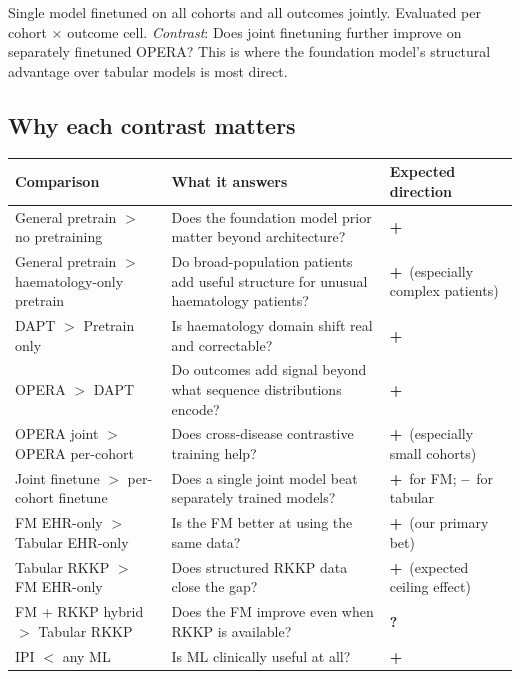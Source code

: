 \documentclass[11pt, a4paper]{article}
\newcommand{\yes}{\textcolor{positive}{\textbf{+}}}
\newcommand{\no}{\textcolor{negative}{\textbf{--}}}
\newcommand{\maybe}{\textcolor{neutral}{\textbf{?}}}
\begin{document}
\begin{tcolorbox}[planbox, title=Tier structure and contrasts of interest]
\begin{description}[leftmargin=0em, itemsep=4pt]
  \item[Tier 5 -- Joint multi-task finetuning]
    Single model finetuned on all cohorts and all outcomes jointly.
    Evaluated per cohort × outcome cell.
    \emph{Contrast}: Does joint finetuning further improve on separately
    finetuned OPERA? This is where the foundation model's structural
    advantage over tabular models is most direct.
\end{description}
\end{tcolorbox}

\subsection{Why each contrast matters}

\begin{center}
\begin{tabularx}{\textwidth}{lXl}
  \toprule
  \textbf{Comparison} & \textbf{What it answers} & \textbf{Expected direction} \\
  \midrule
  General pretrain $>$ no pretraining
    & Does the foundation model prior matter beyond architecture?
    & \yes \\
  General pretrain $>$ haematology-only pretrain
    & Do broad-population patients add useful structure for unusual haematology patients?
    & \yes\ (especially complex patients) \\
  DAPT $>$ Pretrain only
    & Is haematology domain shift real and correctable?
    & \yes \\
  OPERA $>$ DAPT
    & Do outcomes add signal beyond what sequence distributions encode?
    & \yes \\
  OPERA joint $>$ OPERA per-cohort
    & Does cross-disease contrastive training help?
    & \yes\ (especially small cohorts) \\
  Joint finetune $>$ per-cohort finetune
    & Does a single joint model beat separately trained models?
    & \yes\ for FM; \no\ for tabular \\
  FM EHR-only $>$ Tabular EHR-only
    & Is the FM better at using the same data?
    & \yes\ (our primary bet) \\
  Tabular RKKP $>$ FM EHR-only
    & Does structured RKKP data close the gap?
    & \yes\ (expected ceiling effect) \\
  FM + RKKP hybrid $>$ Tabular RKKP
    & Does the FM improve even when RKKP is available?
    & \maybe \\
  IPI $<$ any ML
    & Is ML clinically useful at all?
    & \yes \\
  \bottomrule
\end{tabularx}
\end{center}
\end{document}
